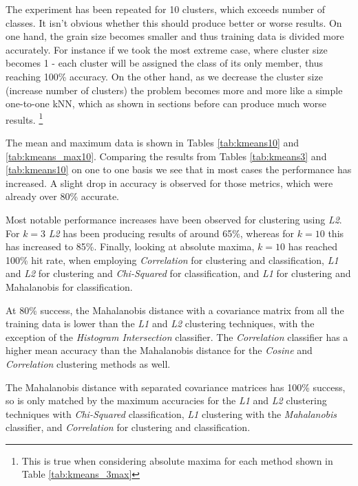\documentclass[10pt,twocolumn,letterpaper]{article}
\begin{document}
The experiment has been repeated for 10 clusters, which exceeds number of classes. It isn't obvious whether this should produce better or worse results. On one hand, the grain size becomes smaller and thus training data is divided more accurately. For instance if we took the most extreme case, where cluster size becomes 1 - each cluster will be assigned the class of its only member, thus reaching 100\% accuracy. On the other hand, as we decrease the cluster size (increase number of clusters) the problem becomes more and more like a simple one-to-one kNN, which as shown in sections before can produce much worse results. \footnote{This is true when considering absolute maxima for each method shown in Table \ref{tab:kmeans_3max}}

The mean and maximum data is shown in Tables \ref{tab:kmeans10}
and \ref{tab:kmeans_max10}. Comparing the results from Tables \ref{tab:kmeans3} and \ref{tab:kmeans10} on one to one basis we see that in most cases the performance has increased. A slight drop in accuracy is observed for those metrics, which were already over 80\% accurate. 

Most notable performance increases have been observed for clustering using \textit{L2}. For $k=3$ \textit{L2} has been producing results of around 65\%, whereas for $k=10$ this has increased to 85\%. Finally, looking at absolute maxima, $k=10$ has reached 100\% hit rate, when employing \textit{Correlation} for clustering and classification, \textit{L1} and \textit{L2} for clustering and \textit{Chi-Squared} for classification, and \textit{L1} for clustering and Mahalanobis for classification.

At 80\% success, the Mahalanobis distance with a covariance matrix from all the training data is lower than the \textit{L1} and \textit{L2} clustering techniques, with the exception of the \textit{Histogram Intersection} classifier. The \textit{Correlation} classifier has a higher mean accuracy than the Mahalanobis distance for the \textit{Cosine} and \textit{Correlation} clustering methods as well.

The Mahalanobis distance with separated covariance matrices has 100\% success, so is only matched by the maximum accuracies for the \textit{L1} and \textit{L2} clustering techniques with \textit{Chi-Squared} classification, \textit{L1} clustering with the \textit{Mahalanobis} classifier, and \textit{Correlation} for clustering and classification.
\end{document}
